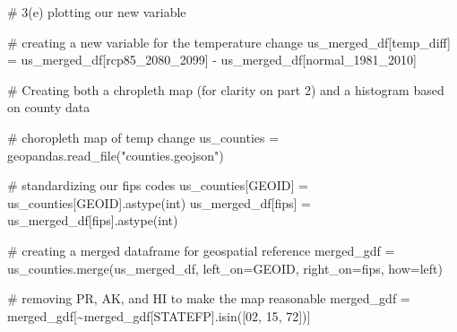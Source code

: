 \documentclass[
  letterpaper,
  DIV=11,
  numbers=noendperiod]{scrartcl}
\newenvironment{Shaded}{\begin{snugshade}}{\end{snugshade}}
\newcommand{\BuiltInTok}[1]{\textcolor[rgb]{0.00,0.23,0.31}{#1}}
\newcommand{\CommentTok}[1]{\textcolor[rgb]{0.37,0.37,0.37}{#1}}
\newcommand{\NormalTok}[1]{\textcolor[rgb]{0.00,0.23,0.31}{#1}}
\newcommand{\OperatorTok}[1]{\textcolor[rgb]{0.37,0.37,0.37}{#1}}
\newcommand{\StringTok}[1]{\textcolor[rgb]{0.13,0.47,0.30}{#1}}
\begin{document}
\begin{Shaded}
\begin{Highlighting}[]
\CommentTok{\# 3(e) plotting our new variable}

\CommentTok{\# creating a new variable for the temperature change}
\NormalTok{us\_merged\_df[}\StringTok{\textquotesingle{}temp\_diff\textquotesingle{}}\NormalTok{] }\OperatorTok{=}\NormalTok{ us\_merged\_df[}\StringTok{\textquotesingle{}rcp85\_2080\_2099\textquotesingle{}}\NormalTok{] }\OperatorTok{{-}}\NormalTok{ us\_merged\_df[}\StringTok{\textquotesingle{}normal\_1981\_2010\textquotesingle{}}\NormalTok{]}

\CommentTok{\# Creating both a chropleth map (for clarity on part 2) and a histogram based on county data}

\CommentTok{\# choropleth map of temp change}
\NormalTok{us\_counties }\OperatorTok{=}\NormalTok{ geopandas.read\_file(}\StringTok{"counties.geojson"}\NormalTok{)}

\CommentTok{\# standardizing our fips codes}
\NormalTok{us\_counties[}\StringTok{\textquotesingle{}GEOID\textquotesingle{}}\NormalTok{] }\OperatorTok{=}\NormalTok{ us\_counties[}\StringTok{\textquotesingle{}GEOID\textquotesingle{}}\NormalTok{].astype(}\BuiltInTok{int}\NormalTok{)}
\NormalTok{us\_merged\_df[}\StringTok{\textquotesingle{}fips\textquotesingle{}}\NormalTok{] }\OperatorTok{=}\NormalTok{ us\_merged\_df[}\StringTok{\textquotesingle{}fips\textquotesingle{}}\NormalTok{].astype(}\BuiltInTok{int}\NormalTok{)}

\CommentTok{\# creating a merged dataframe for geospatial reference}
\NormalTok{merged\_gdf }\OperatorTok{=}\NormalTok{ us\_counties.merge(us\_merged\_df, left\_on}\OperatorTok{=}\StringTok{\textquotesingle{}GEOID\textquotesingle{}}\NormalTok{, right\_on}\OperatorTok{=}\StringTok{\textquotesingle{}fips\textquotesingle{}}\NormalTok{, how}\OperatorTok{=}\StringTok{\textquotesingle{}left\textquotesingle{}}\NormalTok{)}

\CommentTok{\# removing PR, AK, and HI to make the map reasonable}
\NormalTok{merged\_gdf }\OperatorTok{=}\NormalTok{ merged\_gdf[}\OperatorTok{\textasciitilde{}}\NormalTok{merged\_gdf[}\StringTok{\textquotesingle{}STATEFP\textquotesingle{}}\NormalTok{].isin([}\StringTok{\textquotesingle{}02\textquotesingle{}}\NormalTok{, }\StringTok{\textquotesingle{}15\textquotesingle{}}\NormalTok{, }\StringTok{\textquotesingle{}72\textquotesingle{}}\NormalTok{])]}


\end{Highlighting}
\end{Shaded}
\end{document}
